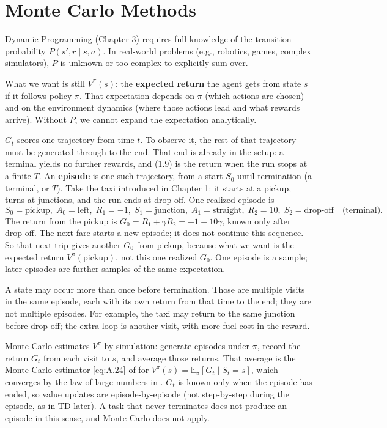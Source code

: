 \chapter{Monte Carlo Methods}

Dynamic Programming (Chapter 3) requires full knowledge of the transition probability $P(s',r \mid s,a)$. In real-world problems (e.g., robotics, games, complex simulators), $P$ is unknown or too complex to explicitly sum over.

What we want is still $V^\pi(s)$: the \textbf{expected return} the agent gets from state $s$ if it follows policy $\pi$. That expectation depends on $\pi$ (which actions are chosen) and on the environment dynamics (where those actions lead and what rewards arrive). Without $P$, we cannot expand the expectation analytically.

$G_t$ scores one trajectory from time $t$. To observe it, the rest of that trajectory must be generated through to the end. That end is already in the setup: a terminal yields no further rewards, and (1.9) is the return when the run stops at a finite $T$. An \textbf{episode} is one such trajectory, from a start $S_0$ until termination (a terminal, or $T$). Take the taxi introduced in Chapter 1: it starts at a pickup, turns at junctions, and the run ends at drop-off. One realized episode is
\[
S_0{=}\text{pickup},\;
A_0{=}\text{left},\;
R_1{=}-1,\;
S_1{=}\text{junction},\;
A_1{=}\text{straight},\;
R_2{=}10,\;
S_2{=}\text{drop-off}
\quad\text{(terminal)}.
\]
The return from the pickup is $G_0=R_1+\gamma R_2=-1+10\gamma$, known only after drop-off. The next fare starts a new episode; it does not continue this sequence. So that next trip gives another $G_0$ from pickup, because what we want is the expected return $V^\pi(\text{pickup})$, not this one realized $G_0$. One episode is a sample; later episodes are further samples of the same expectation.

A state may occur more than once before termination. Those are multiple visits in the same episode, each with its own return from that time to the end; they are not multiple episodes. For example, the taxi may return to the same junction before drop-off; the extra loop is another visit, with more fuel cost in the reward.

Monte Carlo estimates $V^\pi$ by simulation: generate episodes under $\pi$, record the return $G_t$ from each visit to $s$, and average those returns. That average is the Monte Carlo estimator \eqref{eq:A.24} of  for $V^\pi(s)=\mathbb{E}_\pi[G_t\mid S_t=s]$, which converges by the law of large numbers in . $G_t$ is known only when the episode has ended, so value updates are episode-by-episode (not step-by-step during the episode, as in TD later). A task that never terminates does not produce an episode in this sense, and Monte Carlo does not apply.

